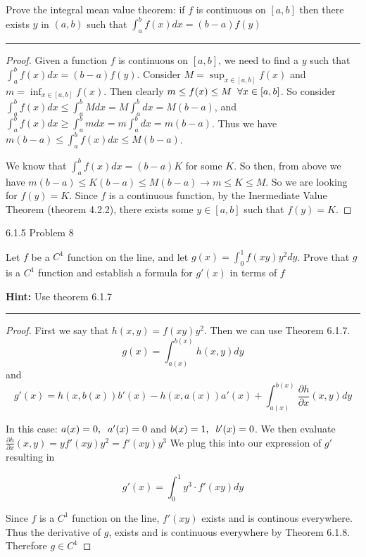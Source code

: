\documentclass[11pt]{article}
\begin{document}
Prove the integral mean value theorem: if $f$ is continuous on $[a,b]$ then there exists $y$ in $(a,b)$ 
such that $\int_a ^b f(x) dx = (b - a)f(y)$
\hrule


\begin{proof}
    Given a function $f$ is continuous on $[a,b]$, we need to find a $y$ such that $\int_a ^b f(x) dx = (b-a) f(y)$. 
    Consider $M = \sup_{x \in [a,b]}f(x)$ and $m = \inf_{x \in [a,b]}f(x)$. Then clearly $m \leq f(x) \leq M \sp \forall x \in [a,b]$. 
    So consider $\int_a ^b f(x)dx \leq \int_a ^b Mdx = M \int_a ^b dx = M(b - a)$, and $\int_a ^b f(x)dx \geq \int_a ^b mdx = m \int_a ^b dx = m(b - a)$.
    Thus we have $m (b - a) \leq \int_a ^b f(x) dx \leq M (b - a)$.

    We know that $\int_a ^b f(x) dx = (b - a) K$ for some $K$. So then, from above we have $m (b - a) \leq K (b-a) \leq M (b - a) \rightarrow m \leq K \leq M$.
    So we are looking for $f(y) = K$. Since $f$ is a continuous function, by the Inermediate Value Theorem (theorem 4.2.2), there exists some $y \in [a,b]$ such that $f(y) = K$.

\end{proof}





 6.1.5 Problem 8

Let $f$ be a $C^1$ function on the line, and let $g(x) = \int_0 ^1 f(xy)y^2 dy$.
Prove that $g$ is a $C^1$ function and establish a formula for $g'(x)$ in terms of $f$

\textbf{Hint:} Use theorem 6.1.7
\hrule

\begin{proof}
    First we say that $h(x,y) = f(xy)y^2$. Then we can use Theorem 6.1.7. $$g(x) = \int_{a(x)} ^{b(x)} h(x,y) dy$$
    and $$g'(x) = h(x, b(x))b'(x) - h(x, a(x))a'(x) + \int_{a(x)} ^{b(x)} \frac{\partial h}{\partial x}(x,y)dy$$

    In this case: $a(x) = 0, \sp a'(x) = 0$ and $b(x) = 1, \sp b'(x) = 0$. 
    We then evaluate $\frac{\partial h}{\partial x}(x,y) = y f'(xy)y^2 = f'(xy) y^3$
    We plug this into our expression of $g'$ resulting in 

    $$g'(x) = \int_0 ^1 y^3 \cdot f'(xy) dy$$

    Since $f$ is a $C^1$ function on the line, $f'(xy)$ exists and is continous everywhere. 
    Thus the derivative of $g$, exists and is continuous everywhere by Theorem 6.1.8. Therefore $g \in C^1$
\end{proof}
\end{document}
